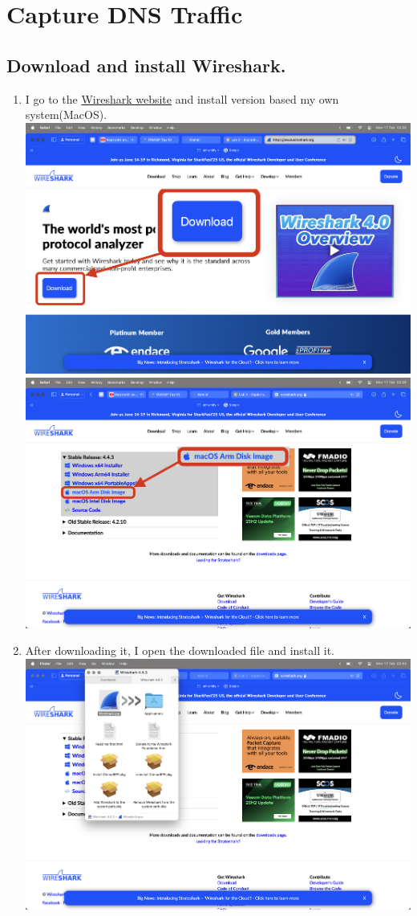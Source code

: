 \documentclass[12pt]{article}
\begin{document}
\section{Capture DNS Traffic}

\subsection{Download and install Wireshark.}

\begin{enumerate}
    \item I go to the \href{https://www.wireshark.org}{Wireshark website} and install version based my own system(MacOS). \\
    \includegraphics[width=.7\textwidth]{Image1.png} \\
    \includegraphics[width=.7\textwidth]{Image2.png} \\
    \item After downloading it, I open the downloaded file and install it. \\ 
    \includegraphics[width=.7\textwidth]{Image3.png} \\

\end{enumerate}
\end{document}
